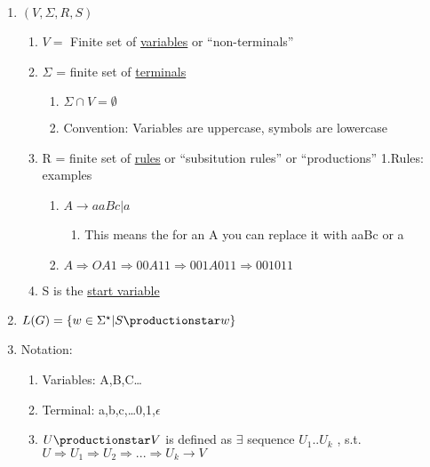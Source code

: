 \documentclass[11pt]{article}
\begin{document}
\begin{enumerate}
\item $(V,\Sigma, R, S)$

\begin{enumerate}
\item $V =$ Finite set of \underline{variables} or ``non-terminals''
\item $\Sigma$ =  finite set of \underline{terminals}

\begin{enumerate}
\item $\Sigma \cap V = \emptyset$
\item Convention: Variables are uppercase, symbols are lowercase
\end{enumerate}

\item R = finite set of \underline{rules} or ``subsitution rules'' or ``productions''
         1.Rules: examples

\begin{enumerate}
\item $A \rightarrow aaBc | a$

\begin{enumerate}
\item This means the for an A you can replace it with aaBc or a
\end{enumerate}

\item $A \Rightarrow OA1 \Rightarrow 00A11 \Rightarrow 001A011 \Rightarrow 001011$
\end{enumerate}

\item S is the \underline{start variable}
\end{enumerate}

\item $L(G) = \{w\in \Sigma^{\star} | S \productionstar w\}$
\item Notation:

\begin{enumerate}
\item Variables: A,B,C\ldots{}
\item Terminal: a,b,c,\ldots{}0,1,$\epsilon$
\item $U \productionstar V$ is defined as $\exists$ sequence
         $U_1..U_k$ , s.t. $U \Rightarrow U_1 \Rightarrow  U_2
         \Rightarrow ... \Rightarrow U_k \rightarrow V$
\end{enumerate}

\end{enumerate}
\end{document}

